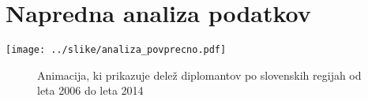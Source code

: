 \documentclass[11pt,a4paper]{article}
\begin{document}
\section{Napredna analiza podatkov}

\texttt{[image: ../slike/analiza\_povprecno.pdf]}


% 
% 

\begin{figure}[H]
\caption{Animacija, ki prikazuje delež diplomantov po slovenskih regijah od leta 2006 do leta 2014}
\end{figure}
\end{document}
